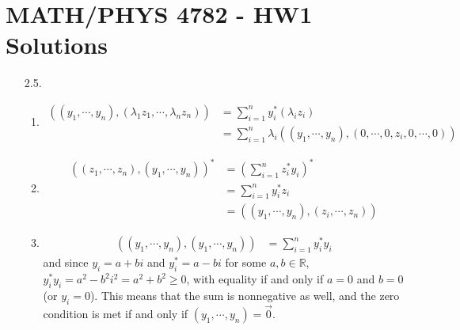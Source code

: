 \documentclass[a4paper,12pt]{article}
\begin{document}
	
\section*{MATH/PHYS 4782 - HW1 Solutions}

\begin{enumerate}

	\item[2.5.]
        \begin{enumerate}[label=(\arabic*)]
            \item
                \begin{align*}
                    ((y_1, \cdots, y_n), (\lambda_1 z_1, \cdots, \lambda_n z_n)) &= \sum_{i = 1}^{n} y_i^* (\lambda_i z_i) \\
                    &= \sum_{i = 1}^{n} \lambda_i ((y_1, \cdots, y_n), (0, \cdots, 0, z_i, 0, \cdots, 0))
                \end{align*}

            \item
                \begin{align*}
                    ((z_1, \cdots, z_n), (y_1, \cdots, y_n))^* &= \left( \sum_{i = 1}^{n} z_i^* y_i \right)^* \\
                    &= \sum_{i = 1}^{n} y_i^* z_i \\
                    &= ((y_1, \cdots, y_n), (z_i, \cdots, z_n))
                \end{align*}

            \item
                \begin{align*}
                    ((y_1, \cdots, y_n), (y_1, \cdots, y_n)) &= \sum_{i = 1}^{n} y_i^* y_i
                \end{align*}
                and since $y_i = a + bi$ and $y_i^* = a - bi$ for some $a, b \in \mathbb{R}$, $y_i^* y_i = a^2 - b^2 i^2 = a^2 + b^2 \geq 0$, with equality if and only if $a = 0$ and $b = 0$ (or $y_i = 0$). This means that the sum is nonnegative as well, and the zero condition is met if and only if $(y_1, \cdots, y_n) = \vec{0}$.
        \end{enumerate}
	

\end{enumerate}
\end{document}
